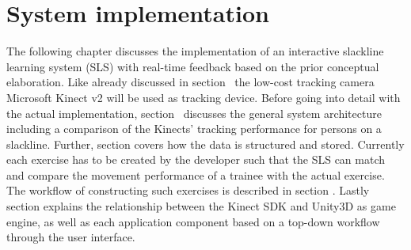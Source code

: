 \chapter{System implementation}\label{5_systemIntegration}
The following chapter discusses the implementation of an interactive slackline learning system (SLS) with real-time feedback based on the prior conceptual elaboration.
Like already discussed in section~\textit{} the low-cost tracking camera Microsoft Kinect v2 will be used as tracking device.
Before going into detail with the actual implementation, section~\textit{} discusses the general system architecture including a comparison of the Kinects' tracking performance for persons on a slackline.
Further, section \textit{} covers how the data is structured and stored.
Currently each exercise has to be created by the developer such that the SLS can match and compare the movement performance of a trainee with the actual exercise. 
The workflow of constructing such exercises is described in section \textit{}.
Lastly section \textit{} explains the relationship between the Kinect SDK and Unity3D as game engine, as well as each application component based on a top-down workflow through the user interface.








